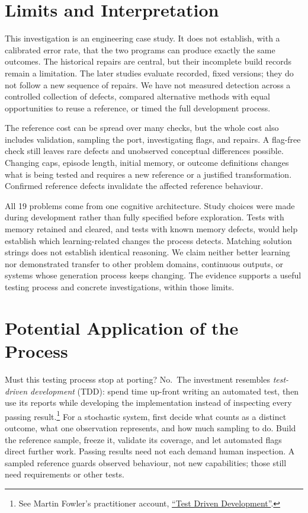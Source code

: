 \documentclass[10pt,letterpaper]{article}
\begin{document}
\section{Limits and Interpretation}\label{sec:limits}

This investigation is an engineering case study. It does not establish, with a calibrated
error rate, that the two programs can produce exactly the same outcomes. The historical
repairs are central, but their incomplete build records remain a limitation. The later
studies evaluate recorded, fixed versions; they do not follow a new sequence of repairs.
We have not measured detection across a controlled collection of defects, compared
alternative methods with equal opportunities to reuse a reference, or timed the full
development process.

The reference cost can be spread over many checks, but the whole cost also includes
validation, sampling the port, investigating flags, and repairs. A flag-free check still
leaves rare defects and unobserved conceptual differences possible. Changing caps, episode
length, initial memory, or outcome definitions changes what is being tested and requires a
new reference or a justified transformation. Confirmed reference defects invalidate the
affected reference behaviour.

All 19 problems come from one cognitive architecture. Study choices were made during
development rather than fully specified before exploration. Tests with memory retained and
cleared, and tests with known memory defects, would help establish which learning-related
changes the process detects. Matching solution strings does not establish identical
reasoning. We claim neither better learning nor demonstrated transfer to other problem
domains, continuous outputs, or systems whose generation process keeps changing. The
evidence supports a useful testing process and concrete investigations, within those
limits.

\section{Potential Application of the Process}\label{sec:applications}

Must this testing process stop at porting? No.~The investment resembles \emph{test-driven
development} (TDD): spend time up-front writing an automated test, then use its reports
while developing the implementation instead of inspecting every passing result.\footnote{See
  Martin Fowler's practitioner account,
  \href{https://martinfowler.com/bliki/TestDrivenDevelopment.html}{``Test Driven
  Development''}.} For a stochastic system, first decide what counts as a distinct
outcome, what one observation represents, and how much sampling to do. Build the reference
sample, freeze it, validate its coverage, and let automated flags direct further work.
Passing results need not each demand human inspection. A sampled reference guards observed
behaviour, not new capabilities; those still need requirements or other tests.
\end{document}
